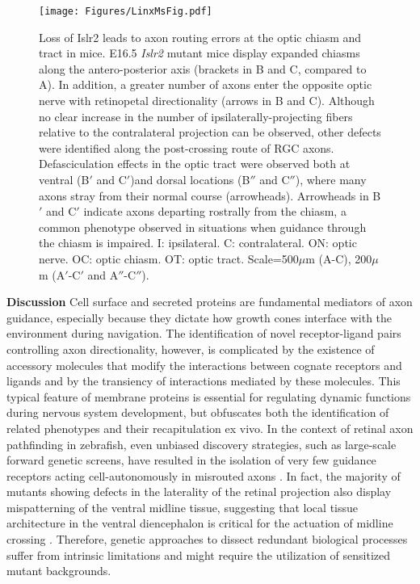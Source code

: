 \begin{figure}[hbtp]
    \begin{center}
        \texttt{[image: Figures/LinxMsFig.pdf]}
        \caption[Loss of Islr2 leads to axon routing errors at the optic chiasm and tract in mice.]
        {Loss of Islr2 leads to axon routing errors at the optic chiasm and tract in mice.
		E16.5 \emph{Islr2} mutant mice display expanded chiasms along the antero-posterior axis (brackets in B and C, compared to A).
		In addition, a greater number of axons enter the opposite optic nerve with retinopetal directionality (arrows in B and C).
		Although no clear increase in the number of ipsilaterally-projecting fibers relative to the contralateral projection can be observed, other defects were identified along the post-crossing route of RGC axons.
		Defasciculation effects in the optic tract were observed both at ventral (B$'$ and C$'$)and dorsal locations (B$''$ and C$''$), where many axons stray from their normal course (arrowheads).
		Arrowheads in B$'$ and C$'$ indicate axons departing rostrally from the chiasm, a common phenotype observed in situations when guidance through the chiasm is impaired. 
		I: ipsilateral.
		C: contralateral.
		ON: optic nerve.
		OC: optic chiasm.
		OT: optic tract.
		Scale=500$\mu$m (A-C), 200$\mu$m (A$'$-C$'$ and A$''$-C$''$).
		}
        \label{LinxMsFig}
    \end{center}
\end{figure}

\noindent\textbf{Discussion}\newline
\indent Cell surface and secreted proteins are fundamental mediators of axon guidance, especially because they dictate how growth cones interface with the environment during navigation.
The identification of novel receptor-ligand pairs controlling axon directionality, however, is complicated by the existence of accessory molecules that modify the interactions between cognate receptors and ligands and by the transiency of interactions mediated
by these molecules.
This typical feature of membrane proteins is essential for regulating dynamic functions during nervous system development, but obfuscates both the identification of related phenotypes and their recapitulation ex vivo.
In the context of retinal axon pathfinding in zebrafish, even unbiased discovery strategies, such as large-scale forward genetic screens, have resulted in the isolation of very few guidance receptors acting cell-autonomously in misrouted axons \cite{karlstrom1996zebrafish,trowe1996mutations}.
In fact, the majority of mutants showing defects in the laterality of the retinal projection also display mispatterning of the ventral midline tissue, suggesting that local tissue architecture in the ventral diencephalon is critical for the actuation of midline crossing \cite{barresi2005hedgehog,seth2006belladonna,bergeron2011brother}.
Therefore, genetic approaches to dissect redundant biological processes suffer from intrinsic limitations and might require the utilization of sensitized mutant backgrounds.

